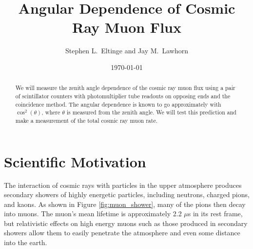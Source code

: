 \usepackage{lgrind} %
\usepackage{chapterbib} %
\usepackage{color} %
\usepackage{graphics}      %
\usepackage[pdftex]{graphicx} %
\usepackage{longtable}     %
\usepackage{epsf} %
\usepackage{bm}            %
\usepackage{thumbpdf}
\usepackage[colorlinks=true]{hyperref} %
\usepackage{multirow}
\usepackage{subfigure}

\newcommand{\cd}{$\cdot$}

%
%


\title{Angular Dependence of Cosmic Ray Muon Flux}
\author{Stephen L.\ Eltinge and Jay M.\ Lawhorn}
\date{\today}

\begin{abstract}
We will measure the zenith angle dependence of the cosmic ray muon flux using a pair of scintillator counters with photomultiplier tube readouts on opposing ends and the coincidence method. The angular dependence is known to go approximately with $\cos^2(\theta)$, where $\theta$ is measured from the zenith angle. We will test this prediction and make a measurement of the total cosmic ray muon rate.
\end{abstract}

\maketitle

\section{Scientific Motivation}

The interaction of cosmic rays with particles in the upper atmosphere produces secondary showers of highly energetic particles, including neutrons, charged pions, and kaons. As shown in Figure \ref{fig:muon_shower}, many of the pions then decay into muons. The muon's mean lifetime is approximately 2.2 $\mu$s in its rest frame, but relativistic effects on high energy muons such as those produced in secondary showers allow them to easily penetrate the atmosphere and even some distance into the earth.

